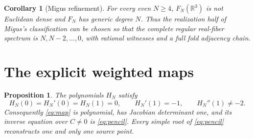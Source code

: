 \documentclass[11pt]{article}
\newtheorem{proposition}[theorem]{Proposition}
\newtheorem{corollary}[theorem]{Corollary}
\newcommand{\R}{\mathbb R}
\numberwithin{equation}{section}
\begin{document}
\begin{corollary}[Migus refinement]\label{cor:migus}
For every even \(N\geq4\), \(F_N(\R^3)\) is not Euclidean dense and \(F_N\)
has generic degree \(N\).  Thus the realization half of Migus's
classification can be chosen so that the complete regular real-fiber
spectrum is \(N,N-2,\ldots,0\), with rational witnesses and a full fold
adjacency chain.
\end{corollary}

\section{The explicit weighted maps}

\begin{proposition}\label{prop:explicit-map}
The polynomials \(H_N\) satisfy
\[
 H_N(0)=H_N'(0)=H_N(1)=0,\qquad H_N'(1)=-1,\qquad
 H_N''(1)\neq-2.
\]
Consequently \eqref{eq:map} is polynomial, has Jacobian determinant one, and its
inverse equation over \(C\neq0\) is \eqref{eq:pencil}.  Every simple root of
\eqref{eq:pencil}
reconstructs one and only one source point.
\end{proposition}
\end{document}
